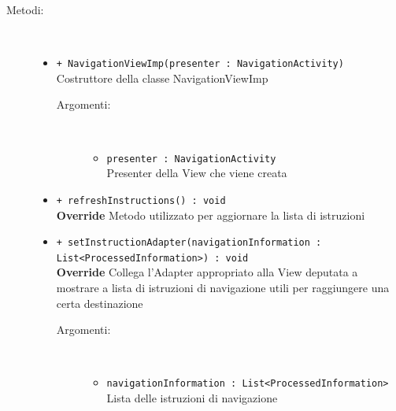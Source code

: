 \documentclass[../DefinizioneDiProdotto.tex]{subfiles}
\begin{document}
\begin{description}
\begin{itemize}
	\end{itemize}
	\item[Metodi:] \
	\begin{itemize}
		\item \texttt{+ NavigationViewImp(presenter : NavigationActivity)}\\
		Costruttore della classe NavigationViewImp
		\begin{description}
			\item[Argomenti:] \
			\begin{itemize}
				\item \texttt{presenter : NavigationActivity}\\
				Presenter della View che viene creata\end{itemize}
		\end{description}
		\item \texttt{+ refreshInstructions() : void}\\
		\textbf{Override} Metodo utilizzato per aggiornare la lista di istruzioni
		\item \texttt{+ setInstructionAdapter(navigationInformation : \\ List<ProcessedInformation>) : void}\\
		\textbf{Override} Collega l'Adapter appropriato alla View deputata a mostrare a lista di istruzioni di navigazione utili per raggiungere una certa destinazione
		\begin{description}
			\item[Argomenti:] \
			\begin{itemize}
				\item \texttt{navigationInformation : List<ProcessedInformation>}\\
				Lista delle istruzioni di navigazione\end{itemize}
		\end{description}
	\end{itemize}
\end{description}
\end{document}
